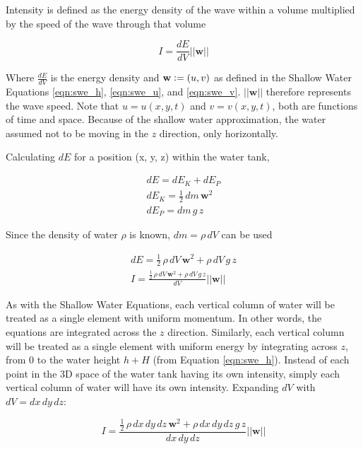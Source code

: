 \documentclass[12pt]{article}
\newcommand{\defeq}{\vcentcolon=}
\begin{document}
Intensity is defined as the energy density of the wave within a volume multiplied by the speed of the wave through that volume

\begin{equation}
    I = \frac{dE}{dV} ||\mathbf{w}||
\end{equation}

Where $\frac{dE}{dV}$ is the energy density and $\mathbf{w} \defeq (u, v)$ as defined in the Shallow Water Equations \ref{eqn:swe_h}, \ref{eqn:swe_u}, and \ref{eqn:swe_v}. $||\mathbf{w}||$ therefore represents the wave speed. Note that $u = u(x, y, t)$ and $v = v(x, y, t)$, both are functions of time and space. Because of the shallow water approximation, the water assumed not to be moving in the $z$ direction, only horizontally.

Calculating $dE$ for a position (x, y, z) within the water tank,

\begin{eqnarray}
    dE = dE_K + dE_P
    \\
    dE_K = \frac{1}{2}\,dm\,\mathbf{w}^2
    \\
    dE_P = dm\,g\,z
\end{eqnarray}

Since the density of water $\rho$ is known, $dm = \rho\,dV$ can be used

\begin{eqnarray}
    dE = \frac{1}{2}\,\rho\,dV\,\mathbf{w}^2 + \rho\,dV\,g\,z
    \\
    I = \frac{\frac{1}{2}\,\rho\,dV\,\mathbf{w}^2 + \rho\,dV\,g\,z}{dV}||\mathbf{w}||
\end{eqnarray}

As with the Shallow Water Equations, each vertical column of water will be treated as a single element with uniform momentum. In other words, the equations are integrated across the $z$ direction. Similarly, each vertical column will be treated as a single element with uniform energy by integrating across $z$, from $0$ to the water height $h + H$ (from Equation \ref{eqn:swe_h}). Instead of each point in the 3D space of the water tank having its own intensity, simply each vertical column of water will have its own intensity. Expanding $dV$ with $dV = dx\,dy\,dz$:

\begin{equation}
    I = \frac{\frac{1}{2}\,\rho\,dx\,dy\,dz\,\mathbf{w}^2 + \rho\,dx\,dy\,dz\,g\,z}{dx\,dy\,dz} ||\mathbf{w}||
\end{equation}
\end{document}
